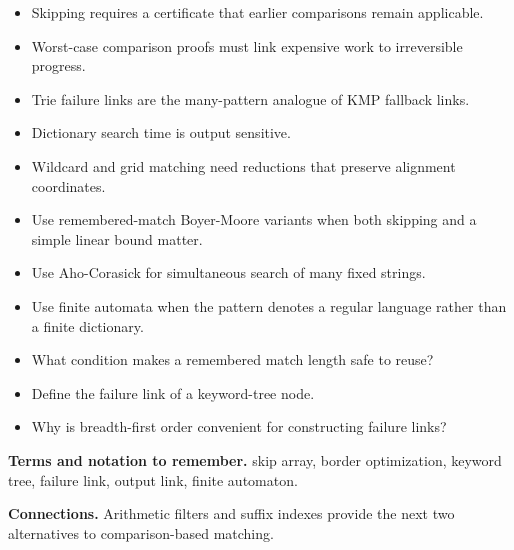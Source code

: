 \documentclass[11pt]{article}
\begin{document}
\begin{tcolorbox}[enhanced,breakable,title={Key takeaways},
  colback=white,colframe=Primary,fonttitle=\small\sffamily\bfseries,fontupper=\footnotesize,
  boxsep=0.6mm,left=1.5mm,right=1.5mm,top=1mm,bottom=1mm,before skip=3pt,after skip=3pt]
\begin{itemize}
  \item Skipping requires a certificate that earlier comparisons remain applicable.
  \item Worst-case comparison proofs must link expensive work to irreversible progress.
  \item Trie failure links are the many-pattern analogue of KMP fallback links.
  \item Dictionary search time is output sensitive.
  \item Wildcard and grid matching need reductions that preserve alignment coordinates.
\end{itemize}
\end{tcolorbox}

\begin{tcolorbox}[enhanced,breakable,title={Algorithm selection / when to use this},
  colback=Primary!3,colframe=Primary,fonttitle=\small\sffamily\bfseries,fontupper=\footnotesize,
  boxsep=0.6mm,left=1.5mm,right=1.5mm,top=1mm,bottom=1mm,before skip=3pt,after skip=3pt]
\begin{itemize}
  \item Use remembered-match Boyer-Moore variants when both skipping and a simple linear bound matter.
  \item Use Aho-Corasick for simultaneous search of many fixed strings.
  \item Use finite automata when the pattern denotes a regular language rather than a finite dictionary.
\end{itemize}
\end{tcolorbox}

\begin{tcolorbox}[enhanced,breakable,title={Self-test questions},
  colback=white,colframe=Accent,fonttitle=\small\sffamily\bfseries,fontupper=\footnotesize,
  boxsep=0.6mm,left=1.5mm,right=1.5mm,top=1mm,bottom=1mm,before skip=3pt,after skip=3pt]
\begin{itemize}
  \item What condition makes a remembered match length safe to reuse?
  \item Define the failure link of a keyword-tree node.
  \item Why is breadth-first order convenient for constructing failure links?
\end{itemize}
\end{tcolorbox}

{\footnotesize
\textbf{Terms and notation to remember.} skip array, border optimization, keyword tree, failure link, output link, finite automaton.

\textbf{Connections.} Arithmetic filters and suffix indexes provide the next two alternatives to comparison-based matching.
}
\end{document}

